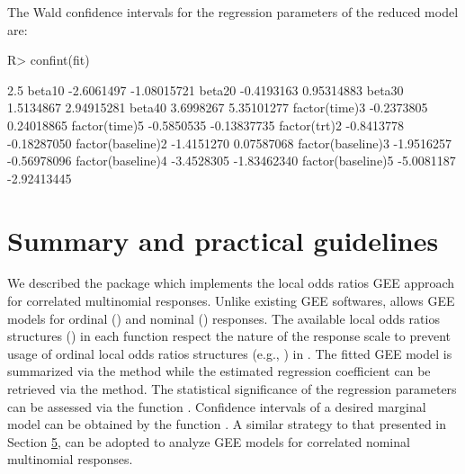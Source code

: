 \documentclass[
]{jss}
\begin{document}
The Wald confidence intervals for the regression parameters of the
reduced model are:

\begin{CodeChunk}
\begin{CodeInput}
R> confint(fit)
\end{CodeInput}
\begin{CodeOutput}
                       2.5 %
beta10            -2.6061497 -1.08015721
beta20            -0.4193163  0.95314883
beta30             1.5134867  2.94915281
beta40             3.6998267  5.35101277
factor(time)3     -0.2373805  0.24018865
factor(time)5     -0.5850535 -0.13837735
factor(trt)2      -0.8413778 -0.18287050
factor(baseline)2 -1.4151270  0.07587068
factor(baseline)3 -1.9516257 -0.56978096
factor(baseline)4 -3.4528305 -1.83462340
factor(baseline)5 -5.0081187 -2.92413445
\end{CodeOutput}
\end{CodeChunk}

\hypertarget{Summary}{%
\section{Summary and practical guidelines}\label{Summary}}

We described the  package  which implements the
local odds ratios GEE approach \citep{Touloumis2012} for correlated
multinomial responses. Unlike existing GEE softwares, 
allows GEE models for ordinal () and nominal
() responses. The available local odds ratios structures
() in each function respect the nature of the response
scale to prevent usage of ordinal local odds ratios structures (e.g.,
) in . The fitted GEE model is
summarized via the  method while the estimated regression
coefficient can be retrieved via the  method. The statistical
significance of the regression parameters can be assessed via the
function . Confidence intervals of a desired marginal model
can be obtained by the function . A similar strategy to
that presented in Section \protect\hyperlink{Example}{5}, can be adopted
to analyze GEE models for correlated nominal multinomial responses.
\end{document}
